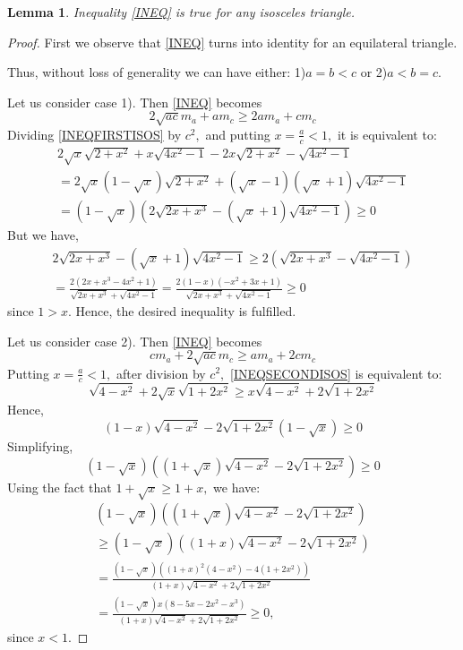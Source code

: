 \documentclass[a4paper,12pt]{article}
\newtheorem{lemma}{Lemma}
\begin{document}
\begin{lemma}\label{isosceles} 
Inequality \eqref{INEQ} is true for any isosceles triangle.
\end{lemma}
\begin{proof} First we observe that \eqref{INEQ} turns into identity for an equilateral triangle. 

Thus, without loss of generality we can have either: 1)$a=b<c$ or 2)$a<b=c.$

Let us consider case 1). Then \eqref{INEQ} becomes
\begin{equation}\label{INEQFIRSTISOS}
2\sqrt{ac} m_a+a m_c \geq 2 a m_a+c m_c 
\end{equation}
Dividing \eqref{INEQFIRSTISOS} by $c^2,$ and putting $x=\frac{a}{c}<1,$ it is equivalent to:
\begin{align*}
2 \sqrt{x} \sqrt{2+x^2}+x\sqrt{4x^2-1} - 2x \sqrt{2+x^2}- \sqrt{4x^2-1} \\
= 2\sqrt{x}(1-\sqrt{x})\sqrt{2+x^2}+(\sqrt{x}-1)(\sqrt{x}+1)\sqrt{4x^2-1} \\
=(1-\sqrt{x})(2\sqrt{2x+x^3}-(\sqrt{x}+1)\sqrt{4x^2-1}) \geq 0
\end{align*}
But we have,
\begin{align*}
2\sqrt{2x+x^3}-(\sqrt{x}+1)\sqrt{4x^2-1} \geq 2(\sqrt{2x+x^3}-\sqrt{4x^2-1})\\
=\frac{2({2x+x^3}-{4x^2+1})}{\sqrt{2x+x^3}+\sqrt{4x^2-1}}=\frac{2(1-x)(-x^2+3x+1)}{\sqrt{2x+x^3}+\sqrt{4x^2-1}} \geq 0
\end{align*}
since $1>x.$ Hence, the desired inequality is fulfilled.



Let us consider case 2). Then \eqref{INEQ} becomes
\begin{equation}\label{INEQSECONDISOS}
c  m_a+2\sqrt{ac} m_c \geq a m_a+2 c m_c 
\end{equation}
Putting $x=\frac{a}{c}<1,$ after division by $c^2,$ \eqref{INEQSECONDISOS} is equivalent to:
\[
\sqrt{4-x^2}+2\sqrt{x}\sqrt{1+2x^2} \geq x\sqrt{4-x^2}+2\sqrt{1+2x^2}
\]
Hence, 
\[
(1- x)\sqrt{4-x^2}-2\sqrt{1+2x^2}(1-\sqrt{x})\geq 0
\]
Simplifying,
\[
(1-\sqrt{x})\left((1+\sqrt{x})\sqrt{4-x^2}-2\sqrt{1+2x^2}\right)\geq 0
\]
Using the fact that $1+\sqrt{x} \geq 1+x,$ we have:
\begin{align*}
(1-\sqrt{x})\left((1+\sqrt{x})\sqrt{4-x^2}-2\sqrt{1+2x^2}\right)\\
\geq (1-\sqrt{x})\left((1+x)\sqrt{4-x^2}-2\sqrt{1+2x^2}\right)\\
=\frac{(1-\sqrt{x})\left((1+x)^2(4-x^2)-4(1+2x^2)\right)}{(1+x)\sqrt{4-x^2}+2\sqrt{1+2x^2}} \\
=\frac{(1-\sqrt{x})x\left(8-5x-2x^2-x^3\right)}{(1+x)\sqrt{4-x^2}+2\sqrt{1+2x^2}}  \geq 0,
\end{align*}
since $x<1.$
\end{proof}
\end{document}

